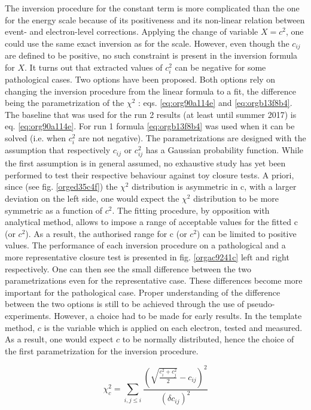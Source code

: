 The inversion procedure for the constant term is more complicated than the one for the energy scale because of its positiveness and its non-linear relation between event- and electron-level corrections.
Applying the change of variable $X=c^2$, one could use the same exact inversion as for the scale.
However, even though the $c_{ij}$ are defined to be positive, no such constraint is present in the inversion formula for $X$.
It turns out that extracted values of $c_{i}^2$ can be negative for some pathological cases.
Two options have been proposed.
Both options rely on changing the inversion procedure from the linear formula to a fit, the difference being the parametrization of the $\chi^2$ : eqs. \ref{eq:org90a114e} and \ref{eq:orgb13f8b4}.
The baseline that was used for the run 2 results (at least until summer 2017) is eq. \ref{eq:org90a114e}.
For run 1 formula \ref{eq:orgb13f8b4} was used when it can be solved (i.e. when $c_{i}^2$ are not negative).
The parametrizations are designed with the assumption that respectively $c_{ij}$ or $c_{ij}^2$ has a Gaussian probability function.
While the first assumption is in general assumed, no exhaustive study has yet been performed to test their respective behaviour against toy closure tests.
A priori, since (see fig. \ref{orged35c4f}) the $\chi^2$ distribution is asymmetric in c, with a larger deviation on the left side, one would expect the $\chi^2$ distribution to be more symmetric as a function of $c^2$.
The fitting procedure, by opposition with analytical method, allows to impose a range of acceptable values for the fitted c (or $c^2$).
As a result, the authorised range for c (or $c^2$) can be limited to positive values.
The performance of each inversion procedure on a pathological and a more representative closure test is presented in fig. \ref{orgac9241c} left and right respectively.
One can then see the small difference between the two parametrizations even for the representative case.
These differences become more important for the pathological case.
Proper understanding of the difference between the two options is still to be achieved through the use of pseudo-experiments.
However, a choice had to be made for early results.
In the template method, $c$ is the variable which is applied on each electron, tested and measured.
As a result, one would expect $c$ to be normally distributed, hence the choice of the first parametrization for the inversion procedure.

\begin{equation}
\label{eq:org90a114e}
\chi_c^2 = \sum \limits_{i, j\leq i} \frac{ (\sqrt{\frac{c_i^2 + c_j^2}{2}} - c_{ij})^2 }{(\delta c_{ij})^2}
\end{equation}

